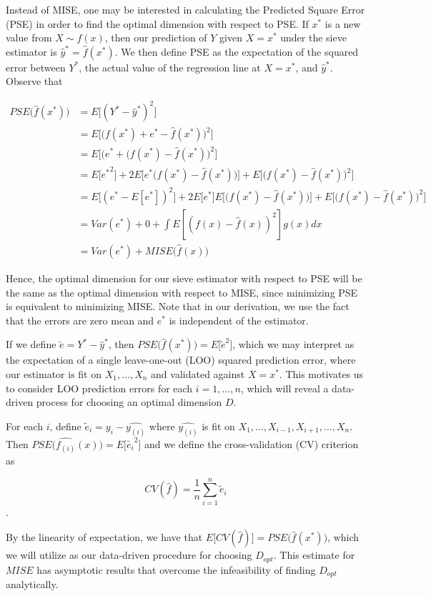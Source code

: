 \documentclass[12pt]{article}  %
\begin{document}
\begin{itemize}
Instead of MISE, one may be interested in calculating the Predicted Square Error (PSE) in order to find the optimal dimension with respect to PSE. If $x^*$  is a new value from $X \sim f(x)$, then our prediction of $Y$ given $X = x^*$ under the sieve estimator is $\hat{y}^* = \hat{f}(x^*)$. We then define PSE as the expectation of the squared error between $Y^*$, the actual value of the regression line at $X=x^*$, and $\hat{y}^*$. Observe that

\begin{align*}
PSE\Big(\hat{f}(x^*)\Big) &= E\Big[(Y^* - \hat{y}^*)^2\Big] \\
&= E\Big[\Big(f(x^*) + e^* - \hat{f}(x^*)\Big)^2\Big] \\
&= E\Big[\Big(e^* + (f(x^*) - \hat{f}(x^*)\Big)^2\Big] \\
&= E\big[{e^*}^2\big] + 2E\Big[e^*\Big(f(x^*) - \hat{f}(x^*)\Big)\Big] + E\Big[\Big(f(x^*) - \hat{f}(x^*)\Big)^2\Big] \\
&= E\Big[{(e^* - E[e^*])}^2\Big] + 2E\big[e^*\big]E\Big[\Big(f(x^*) - \hat{f}(x^*)\Big)\Big] + E\Big[\Big(f(x^*) - \hat{f}(x^*)\Big)^2\Big] \\
&= Var(e^*) + 0 + \int E[(f(x) - \hat{f}(x))^2]g(x)dx \\
& = Var(e^*) + MISE\Big(\hat{f}(x)\Big)
\end{align*}

Hence, the optimal dimension for our sieve estimator with respect to PSE will be the same as the optimal dimension with respect to MISE, since minimizing PSE is equivalent to minimizing MISE. Note that in our derivation, we use the fact that the errors are zero mean and $e^*$ is independent of the estimator. 

If we define $\tilde{e} = Y^* - \hat{y}^*$, then $PSE\Big(\hat{f}(x^*)\Big) = E\big[\tilde{e}^2\big]$, which we may interpret as the expectation of a single leave-one-out (LOO) squared prediction error, where our estimator is fit on $X_1, \ldots, X_n$ and validated against $X = x^*$. This motivates us to consider LOO prediction errors for each $i = 1, \ldots, n$, which will reveal a data-driven process for choosing an optimal dimension $D$.

For each $i$, define $\tilde{e}_i = y_i - \hat{y_{(i)}}$ where $\hat{y_{(i)}}$ is fit on $X_1, \ldots, X_{i-1}, X_{i+1}, \ldots, X_n$. Then $PSE\Big(\hat{f_{(i)}}(x)\Big) = E\big[\tilde{e_i}^2\big]$ and we define the cross-validation (CV) criterion as

$$CV(\hat{f}) = \frac{1}{n}\sum_{i=1}^n \tilde{e}_i$$.

By the linearity of expectation, we have that $E\Big[CV(\hat{f})\Big] = PSE\Big(\hat{f}(x^*)\Big)$, which we will utilize as our data-driven procedure for choosing $D_{opt}$. This estimate for $MISE$ has asymptotic results that overcome the infeasibility of finding $D_{opt}$ analytically.

\end{itemize}
\end{document}
